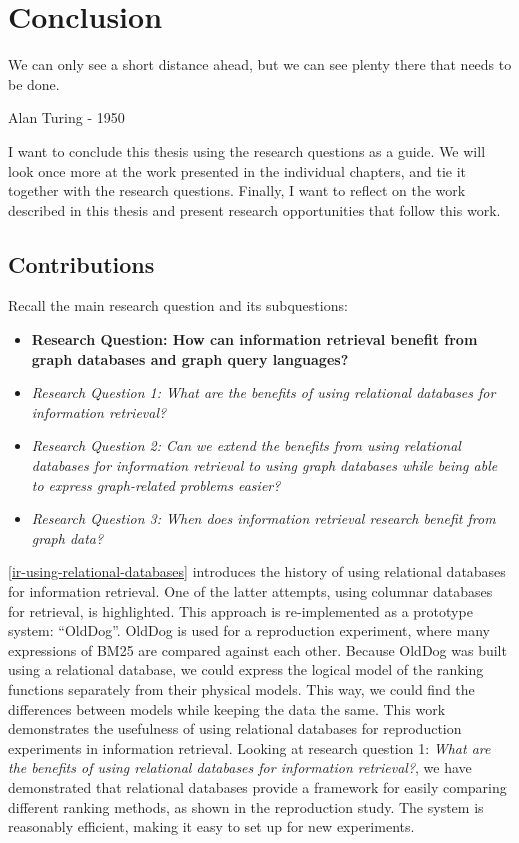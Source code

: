 \chapter{Conclusion}
\label{conclusion}
\epigraph{We can only see a short distance ahead, but we can see plenty there that needs to be done.}{Alan Turing - 1950}

 I want to conclude this thesis using the research questions as a guide. We will look once more at the work presented in the individual chapters, and tie it together with the research questions. Finally, I want to reflect on the work described in this thesis and present research opportunities that follow this work.

\section{Contributions}
Recall the main research question and its subquestions:
\begin{itemize}
	\item \textbf{Research Question: How can information retrieval benefit from graph databases and graph query languages?}
	\item \emph{Research Question 1: What are the benefits of using relational databases for information retrieval?} 
	\item \emph{Research Question 2: Can we extend the benefits from using relational databases for information retrieval to using graph databases while being able to express graph-related problems easier?} 
	\item \emph{Research Question 3: When does information retrieval research benefit from graph data?} 
\end{itemize}

\cref{ir-using-relational-databases} introduces the history of using relational databases for information retrieval. One of the latter attempts, using columnar databases for retrieval, is highlighted. This approach is re-implemented as a prototype system: ``OldDog''. OldDog is used for a reproduction experiment, where many expressions of BM25 are compared against each other. Because OldDog was built using a relational database, we could express the logical model of the ranking functions separately from their physical models. This way, we could find the differences between models while keeping the data the same. This work demonstrates the usefulness of using relational databases for reproduction experiments in information retrieval. Looking at research question 1: \emph{What are the benefits of using relational databases for information retrieval?}, we have demonstrated that relational databases provide a framework for easily comparing different ranking methods, as shown in the reproduction study. The system is reasonably efficient, making it easy to set up for new experiments. 

